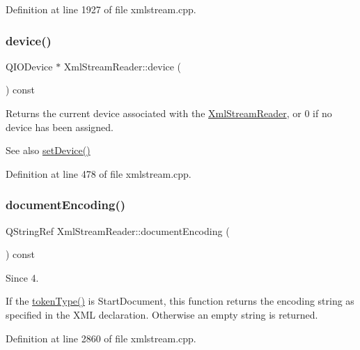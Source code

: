 Definition at line 1927 of file xmlstream.\+cpp.

\mbox{\label{class_xml_stream_reader_aa2a751d1b36fac13138b2f370683dfe7}} 
\subsubsection{\texorpdfstring{device()}{device()}}
{\footnotesize\ttfamily Q\+I\+O\+Device $\ast$ Xml\+Stream\+Reader\+::device (\begin{DoxyParamCaption}{ }\end{DoxyParamCaption}) const}

Returns the current device associated with the \hyperlink{class_xml_stream_reader}{Xml\+Stream\+Reader}, or 0 if no device has been assigned.

\begin{DoxySeeAlso}{See also}
\hyperlink{class_xml_stream_reader_a0d166c5c7814d44a0015a82f0500cee5}{set\+Device()} 
\end{DoxySeeAlso}


Definition at line 478 of file xmlstream.\+cpp.

\mbox{\label{class_xml_stream_reader_a8326fe20290e37d1c1549737cc02d25b}} 
\subsubsection{\texorpdfstring{document\+Encoding()}{documentEncoding()}}
{\footnotesize\ttfamily Q\+String\+Ref Xml\+Stream\+Reader\+::document\+Encoding (\begin{DoxyParamCaption}{ }\end{DoxyParamCaption}) const}

\begin{DoxySince}{Since}
4.
\end{DoxySince}
If the \hyperlink{class_xml_stream_reader_a2c26bfb63c27f2992e24f038d65c8c0a}{token\+Type()} is  Start\+Document, this function returns the encoding string as specified in the X\+ML declaration. Otherwise an empty string is returned. 

Definition at line 2860 of file xmlstream.\+cpp.

